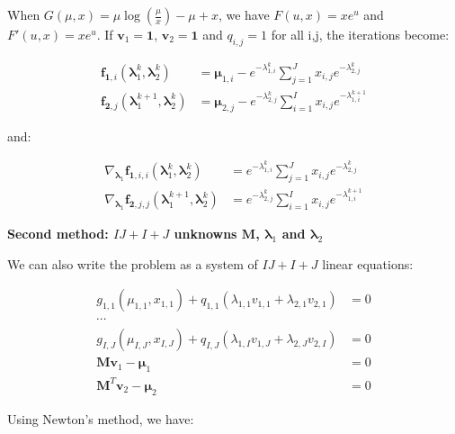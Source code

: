 \documentclass{tex/note}
\begin{document}
When $G \left( \mu , x \right) = \mu \log \left( \frac{\mu}{x} \right) - \mu + x$, we have $F \left( u , x \right) = x e^u$ and $F' \left( u , x \right) = x e^u$. If $\bm{v}_1 = \bm{1}$, $\bm{v}_2 = \bm{1}$ and $q_{i,j} = 1$ for all {i,j}, the iterations become:

\begin{align*}
\bm{f}_{\bm{1},i} \left( \bm{\lambda}_1^k , \bm{\lambda}_2^k \right) &= \bm{\mu}_{1,i} - e^{- \lambda_{1,i}^k} \sum_{j = 1}^J x_{i,j} e^{- \lambda_{2,j}^k} \\
\bm{f}_{\bm{2},j} \left( \bm{\lambda}_1^{k+1} , \bm{\lambda}_2^k \right) &= \bm{\mu}_{2,j} - e^{- \lambda_{2,j}^k} \sum_{i = 1}^I x_{i,j} e^{- \lambda_{1,i}^{k+1}}
\end{align*}

and:

\begin{align*}
\nabla_{\bm{\lambda}_1} \bm{f}_{\bm{1},i,i} \left( \bm{\lambda}_1^k , \bm{\lambda}_2^k \right) &= e^{-\lambda_{1,i}^k} \sum_{j = 1}^J x_{i,j} e^{- \lambda_{2,j}^k} \\
\nabla_{\bm{\lambda}_1} \bm{f}_{\bm{2},j,j} \left( \bm{\lambda}_1^{k + 1} , \bm{\lambda}_2^k \right) &= e^{-\lambda_{2,j}^k} \sum_{i = 1}^I x_{i,j} e^{- \lambda_{1,i}^{k + 1}}
\end{align*}

\textbf{Second method: $I J + I + J$ unknowns $\bm{M}$, $\bm{\lambda}_1$ and $\bm{\lambda}_2$}

We can also write the problem as a system of $I J + I + J$ linear equations:

\begin{align*}
g_{1,1} \left( \mu_{1,1} , x_{1,1} \right) + q_{1,1} \left( \lambda_{1,1} v_{1,1} + \lambda_{2,1} v_{2,1} \right) &= 0 \\
\cdots & \\
g_{I,J} \left( \mu_{I,J} , x_{I,J} \right) + q_{I,J} \left( \lambda_{1,I} v_{1,J} + \lambda_{2,J} v_{2,I} \right) &= 0 \\
\bm{M} \bm{v}_1 - \bm{\mu}_1 &= 0 \\
\bm{M}^T \bm{v}_2 - \bm{\mu}_2 &= 0
\end{align*}

Using Newton's method, we have:
\end{document}
